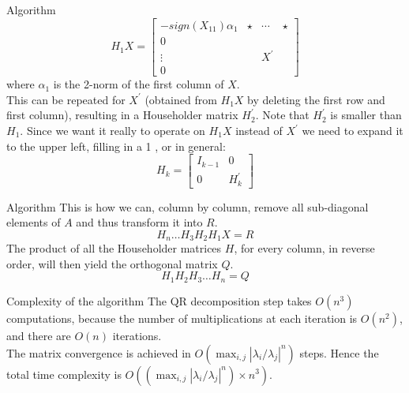 \begin{frame}{Algorithm}
    $$
    H_{1} X=\left[\begin{array}{cccc}
    -sign(X_{11})\alpha_{1} & \star & \cdots & \star \\
    0 & & & \\
    \vdots & & X^{\prime} & \\
    0 & & &
    \end{array}\right]
    $$
    where $\alpha_1$ is the 2-norm of the first column of $X$.\\
    This can be repeated for $X^{\prime}$ (obtained from $H_{1} X$ by deleting the first row and first column), resulting in a Householder matrix $H_{2}^{\prime} .$ Note that $H_{2}^{\prime}$ is smaller than $H_{1}$. Since we want it really to operate on $H_{1} X$ instead of $X^{\prime}$ we need to expand it to the upper left, filling in a 1 , or in general:
    $$
    H_{k}=\left[\begin{array}{cc}
    I_{k-1} & 0 \\
    0 & H_{k}^{\prime}
    \end{array}\right]
    $$
\end{frame}

\begin{frame}{Algorithm}
This is how we can, column by column, remove all sub-diagonal elements of $A$ and thus transform it into $R$.
$$H_{n} \ldots H_{3} H_{2} H_{1} X=R$$
The product of all the Householder matrices $H$, for every column, in reverse order, will then yield the orthogonal matrix $Q$.
$$
H_{1} H_{2} H_{3} \ldots H_{n}=Q
$$
\end{frame}

\begin{frame}{Complexity of the algorithm}
    The QR decomposition step takes $O(n ^ 3)$ computations, because the number of multiplications at each iteration is $O(n^2)$, and there are $O(n)$ iterations. \\
    The matrix convergence is achieved in $O(\max_{i, j} |\lambda_i / \lambda_j| ^ n)$ steps. Hence the total time complexity is $O((\max_{i, j} |\lambda_i / \lambda_j| ^ n) \times n ^ 3)$.
\end{frame}